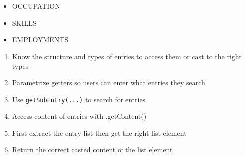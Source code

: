 \documentclass[12pt]{article}
\begin{document}
\begin{itemize}
  \item OCCUPATION
  \item SKILLS
  \item EMPLOYMENTS
\end{itemize}

\begin{enumerate}
\item Know the structure and types of entries to access them or cast to the right types
\item Parametrize getters so users can enter what entries they search
\item Use {\tt getSubEntry(...)} to search for entries
\item Access content of entries with .getContent()
\item First extract the entry list then get the right list element
\item Return the correct casted content of the list element
\end{enumerate}
\end{document}
